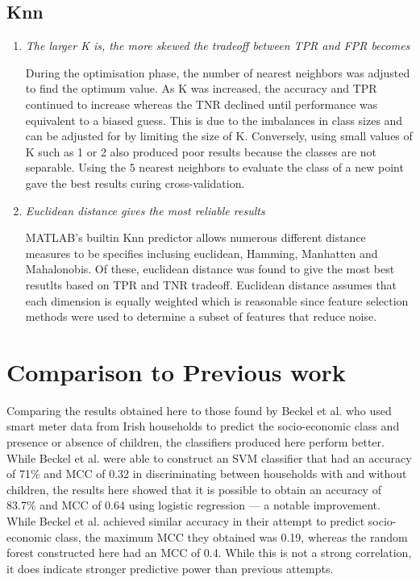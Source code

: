 \subsection{Knn}

\begin{enumerate}

\item \textit{The larger K is, the more skewed the tradeoff between TPR and FPR becomes}

During the optimisation phase, the number of nearest neighbors was adjusted to find the optimum value. As K was increased, the accuracy and TPR continued to increase whereas the TNR declined until performance was equivalent to a biased guess. This is due to the imbalances in class sizes and can be adjusted for by limiting the size of K. Conversely, using small values of K such as 1 or 2 also produced poor results because the classes are not separable. Using the 5 nearest neighbors to evaluate the class of a new point gave the best results curing cross-validation.

\item \textit{Euclidean distance gives the most reliable results}

MATLAB's builtin Knn predictor allows numerous different distance measures to be specifies inclusing euclidean, Hamming, Manhatten and Mahalonobis. Of these, euclidean distance was found to give the most best resutlts based on TPR and TNR tradeoff. Euclidean distance assumes that each dimension is equally weighted which is reasonable since feature selection methods were used to determine a subset of features that reduce noise.
\end{enumerate}


\section{Comparison to Previous work}

Comparing the results obtained here to those found by Beckel et al. \cite{Beckel_1, Beckel_2, Beckel_3} who used smart meter data from Irish households to predict the socio-economic class and presence or absence of children, the classifiers produced here perform better. While Beckel et al. were able to construct an SVM classifier that had an accuracy of 71\% and MCC of 0.32 in discriminating between households with and without children, the results here showed that it is possible to obtain an accuracy of 83.7\% and MCC of 0.64 using logistic regression --- a notable improvement. While Beckel et al. achieved similar accuracy in their attempt to predict socio-economic class, the maximum MCC they obtained was 0.19, whereas the random forest constructed here had an MCC of 0.4. While this is not a strong correlation, it does indicate stronger predictive power than previous attempts.


